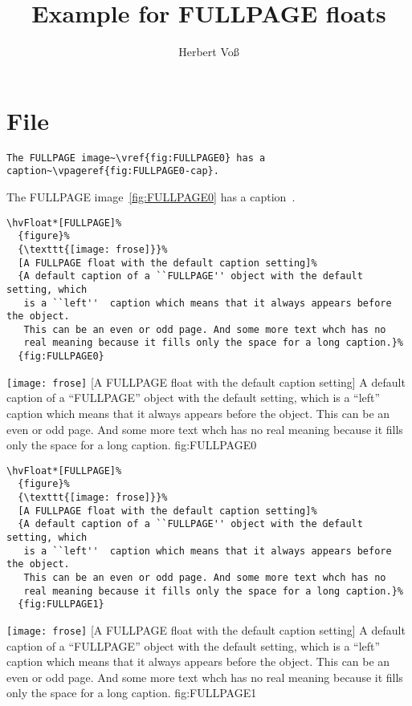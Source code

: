 \documentclass[twocolumn]{scrartcl}
\begin{document}
\title{Example for FULLPAGE floats}
\author{Herbert Voß}
\maketitle

\tableofcontents

\blinddocument

\section{File \texttt{\jobname}}

\begin{lstlisting}
The FULLPAGE image~\vref{fig:FULLPAGE0} has a caption~\vpageref{fig:FULLPAGE0-cap}.
\end{lstlisting}

The FULLPAGE image~\vref{fig:FULLPAGE0} has a caption~.

\begin{lstlisting}
\hvFloat*[FULLPAGE]%
  {figure}%
  {\texttt{[image: frose]}}%
  [A FULLPAGE float with the default caption setting]%
  {A default caption of a ``FULLPAGE'' object with the default setting, which
   is a ``left''  caption which means that it always appears before the object.
   This can be an even or odd page. And some more text whch has no
   real meaning because it fills only the space for a long caption.}%
  {fig:FULLPAGE0}
\end{lstlisting}


\Float[default]
%
  {\texttt{[image: frose]}}%
  [A FULLPAGE float with the default caption setting]%
  {A default caption of a ``FULLPAGE'' object with the default setting, which
   is a ``left''  caption which means that it always appears before the object.
   This can be an even or odd page. And some more text whch has no
   real meaning because it fills only the space for a long caption.}%
  {fig:FULLPAGE0}

\blinddocument

\begin{lstlisting}
\hvFloat*[FULLPAGE]%
  {figure}%
  {\texttt{[image: frose]}}%
  [A FULLPAGE float with the default caption setting]%
  {A default caption of a ``FULLPAGE'' object with the default setting, which
   is a ``left''  caption which means that it always appears before the object.
   This can be an even or odd page. And some more text whch has no
   real meaning because it fills only the space for a long caption.}%
  {fig:FULLPAGE1}
\end{lstlisting}


\Float[default]
%
  {\texttt{[image: frose]}}%
  [A FULLPAGE float with the default caption setting]%
  {A default caption of a ``FULLPAGE'' object with the default setting, which
   is a ``left''  caption which means that it always appears before the object.
   This can be an even or odd page. And some more text whch has no
   real meaning because it fills only the space for a long caption.}%
  {fig:FULLPAGE1}

\blinddocument

\Blindtext

\blindtext
\end{document}
